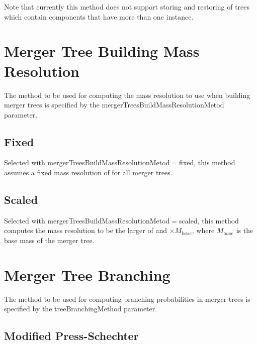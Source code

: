Note that currently this method does not support storing and restoring of trees which contain components that have more than one instance.

\section{Merger Tree Building Mass Resolution}\label{sec:MergerTreeBuildingMassResolution}

The method to be used for computing the mass resolution to use when building merger trees is specified by the {\normalfont \ttfamily mergerTreesBuildMassResolutionMetod} parameter.

\subsection{Fixed}

Selected with {\normalfont \ttfamily mergerTreesBuildMassResolutionMetod}$=${\normalfont \ttfamily fixed}, this method assumes a fixed mass resolution of {\normalfont \ttfamily [mergerTreeBuildMassResolutionFixed]} for all merger trees.

\subsection{Scaled}

Selected with {\normalfont \ttfamily mergerTreesBuildMassResolutionMetod}$=${\normalfont \ttfamily scaled}, this method computes the mass resolution to be the larger of {\normalfont \ttfamily [mergerTreeBuildMassResolutionScaledMinimum]} and {\normalfont \ttfamily [mergerTreeBuildMassResolutionScaledFraction]}$\times M_{\mathrm base}$, where $M_{\mathrm base}$ is the base mass of the merger tree.

\section{Merger Tree Branching}

The method to be used for computing branching probabilities in merger trees is specified by the {\normalfont \ttfamily treeBranchingMethod} parameter.

\subsection{Modified Press-Schechter}

